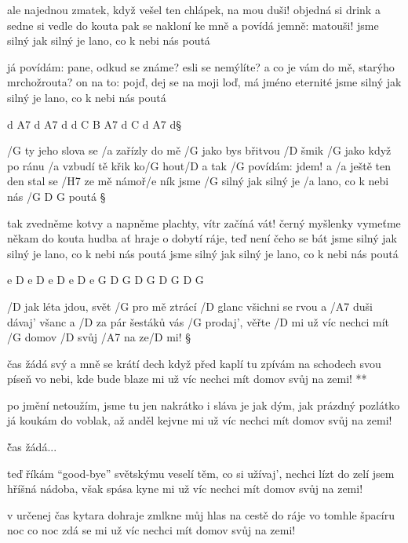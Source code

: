 ale najednou zmatek, když vešel ten chlápek, na mou duši!
objedná si drink a sedne si vedle do kouta
pak se nakloní ke mně a povídá jemně: matouši!
jsme silný jak silný je lano, co k nebi nás poutá \s

já povídám: pane, odkud se známe? esli se nemýlíte?
a co je vám do mě, starýho mrchožrouta?
on na to: pojď, dej se na moji loď, má jméno eternité
jsme silný jak silný je lano, co k nebi nás poutá \s

d A7 d A7 d
d C B A7 d C d A7 d\S

/G ty jeho slova se /a zařízly do mě /G jako bys břitvou /D šmik
/G jako když po ránu /a vzbudí tě křik ko/G hout/D a
tak /G povídám: jdem! a /a ještě ten den stal se /H7 ze mě námoř/e ník
jsme /G silný jak silný je /a lano, co k nebi nás /{G D G} poutá \S

tak zvedněme kotvy a napněme plachty, vítr začíná vát!
černý myšlenky vymeťme někam do kouta
hudba ať hraje o dobytí ráje, teď není čeho se bát
jsme silný jak silný je lano, co k nebi nás poutá
jsme silný jak silný je lano, co k nebi nás poutá \s

e D e D e D e D e
G D G D G D G D G




/D jak léta jdou, svět /G pro mě ztrácí /D glanc
všichni se rvou a /A7 duši dávaj' všanc
a /D za pár šestáků vás /G prodaj', věřte /D mi
už víc nechci mít /G domov /D svůj /A7 na ze/D mi! \S

\R  čas žádá svý a mně se krátí dech
    když před kaplí tu zpívám na schodech
    svou píseň vo nebi, kde bude blaze mi
    už víc nechci mít domov svůj na zemi! **

po jmění netoužím, jsme tu jen nakrátko
i sláva je jak dým, jak prázdný pozlátko
já koukám do voblak, až anděl kejvne mi
už víc nechci mít domov svůj na zemi!

\r čas žádá...

teď říkám ``good-bye'' světskýmu veselí
těm, co si užívaj', nechci lízt do zelí
jsem hříšná nádoba, však spása kyne mi
už víc nechci mít domov svůj na zemi!

\rr

v určenej čas kytara dohraje
zmlkne můj hlas na cestě do ráje
vo tomhle špacíru noc co noc zdá se mi
už víc nechci mít domov svůj na zemi!

\rr




